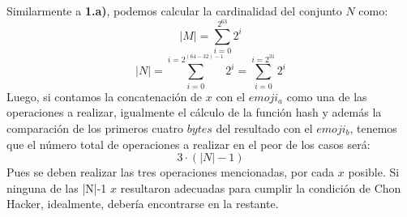 \documentclass[14pt]{article}
\begin{document}
\begin{enumerate}[label=\alph*)]
  Similarmente a \textbf{1.a)}, podemos calcular la cardinalidad del conjunto $N$ como:
  \begin{equation}
    |M| = \sum_{i = 0}^{2^{63}} 2^i
  \end{equation}
  \begin{equation}
    |N| = \sum_{i = 0}^{i = 2^{(64-32)-1}}2^i = \sum_{i = 0}^{i = 2^{31}}2^i
  \end{equation}
  Luego, si contamos la concatenación de $x$ con el $emoji_a$ como una de las operaciones a realizar, igualmente el cálculo de la función hash y además la comparación de los primeros cuatro $bytes$
  del resultado con el $emoji_b$, tenemos que el número total de operaciones a realizar en el
  peor de los casos será:
  \begin{equation}
    3 \cdot (|N| - 1)
  \end{equation}
  Pues se deben realizar las tres operaciones mencionadas, por cada $x$ posible. Si ninguna de
  las |N|-1 $x$ resultaron adecuadas para cumplir la condición de Chon Hacker, idealmente, debería
  encontrarse en la restante.\\
  

\end{enumerate}
\end{document}
